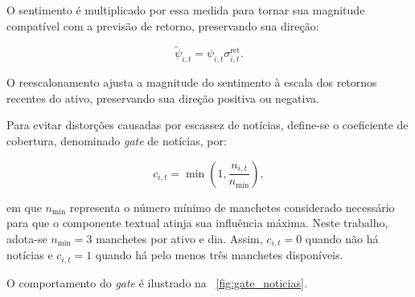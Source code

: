O sentimento é multiplicado por essa medida para tornar sua
magnitude compatível com a previsão de retorno, preservando
sua direção:

\begin{equation}
    \widetilde{\psi}_{i,t}
    =
    \psi_{i,t}
    \sigma_{i,t}^{\mathrm{ret}}.
    \label{eq:sentimento_reescalonado}
\end{equation}

O reescalonamento ajusta a magnitude do sentimento à escala
dos retornos recentes do ativo, preservando sua direção
positiva ou negativa.

Para evitar distorções causadas por escassez de notícias, define-se o coeficiente de cobertura, denominado \textit{gate} de notícias, por:

\begin{equation}
    c_{i,t}
    =
    \min
    \left(
        1,
        \frac{n_{i,t}}{n_{\min}}
    \right),
    \label{eq:gate_cobertura}
\end{equation}

\noindent em que $n_{\min}$ representa o número mínimo de manchetes considerado necessário para que o componente textual atinja sua influência máxima. Neste trabalho, adota-se $n_{\min}=3$ manchetes por ativo e dia. Assim, $c_{i,t}=0$ quando não há notícias e $c_{i,t}=1$ quando há pelo menos três manchetes disponíveis.

O comportamento do \textit{gate} é ilustrado na ~\ref{fig:gate_noticias}.

